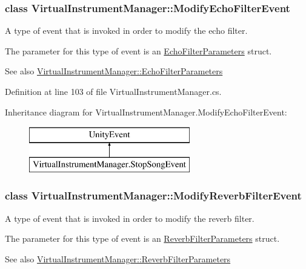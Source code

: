 \subsubsection{class Virtual\+Instrument\+Manager\+:\+:Modify\+Echo\+Filter\+Event}
A type of event that is invoked in order to modify the echo filter. 

The parameter for this type of event is an \hyperlink{group__filter_params_struct_virtual_instrument_manager_1_1_echo_filter_parameters}{Echo\+Filter\+Parameters} struct.

\begin{DoxySeeAlso}{See also}
\hyperlink{group__filter_params_struct_virtual_instrument_manager_1_1_echo_filter_parameters}{Virtual\+Instrument\+Manager\+::\+Echo\+Filter\+Parameters} 
\end{DoxySeeAlso}


Definition at line 103 of file Virtual\+Instrument\+Manager.\+cs.

Inheritance diagram for Virtual\+Instrument\+Manager.\+Modify\+Echo\+Filter\+Event\+:\begin{figure}[H]
\begin{center}
\leavevmode
\includegraphics[height=2.000000cm]{group___v_i_m_event_types}
\end{center}
\end{figure}
\label{class_virtual_instrument_manager_1_1_modify_reverb_filter_event}
\subsubsection{class Virtual\+Instrument\+Manager\+:\+:Modify\+Reverb\+Filter\+Event}
A type of event that is invoked in order to modify the reverb filter. 

The parameter for this type of event is an \hyperlink{group__filter_params_struct_virtual_instrument_manager_1_1_reverb_filter_parameters}{Reverb\+Filter\+Parameters} struct.

\begin{DoxySeeAlso}{See also}
\hyperlink{group__filter_params_struct_virtual_instrument_manager_1_1_reverb_filter_parameters}{Virtual\+Instrument\+Manager\+::\+Reverb\+Filter\+Parameters} 
\end{DoxySeeAlso}


